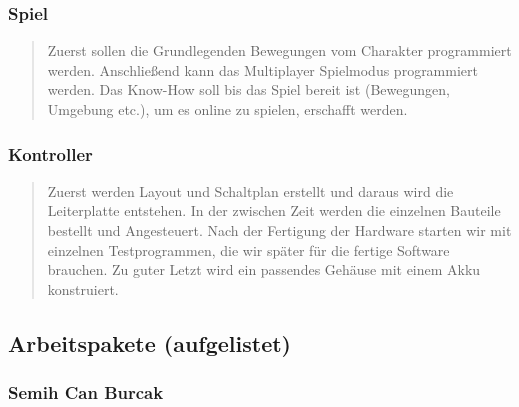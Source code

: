 \hypertarget{spiel}{%
\subsubsection{Spiel}\label{spiel}}
\begin{quote}
Zuerst sollen die Grundlegenden Bewegungen vom Charakter programmiert
werden. Anschließend kann das Multiplayer Spielmodus programmiert
werden. Das Know-How soll bis das Spiel bereit ist (Bewegungen, Umgebung
etc.), um es online zu spielen, erschafft werden.
\end{quote}
\hypertarget{kontroller}{%
\subsubsection{Kontroller}\label{kontroller}}
\begin{quote}
Zuerst werden Layout und Schaltplan erstellt und daraus wird die
Leiterplatte entstehen. In der zwischen Zeit werden die einzelnen
Bauteile bestellt und Angesteuert. Nach der Fertigung der Hardware
starten wir mit einzelnen Testprogrammen, die wir später für die fertige
Software brauchen. Zu guter Letzt wird ein passendes Gehäuse mit einem
Akku konstruiert.
\end{quote}
\hypertarget{arbeitspakete-aufgelistet}{%
\subsection{Arbeitspakete
(aufgelistet)}\label{arbeitspakete-aufgelistet}}

\hypertarget{semih-can-burcak}{%
\subsubsection{Semih Can Burcak}\label{semih-can-burcak}}

